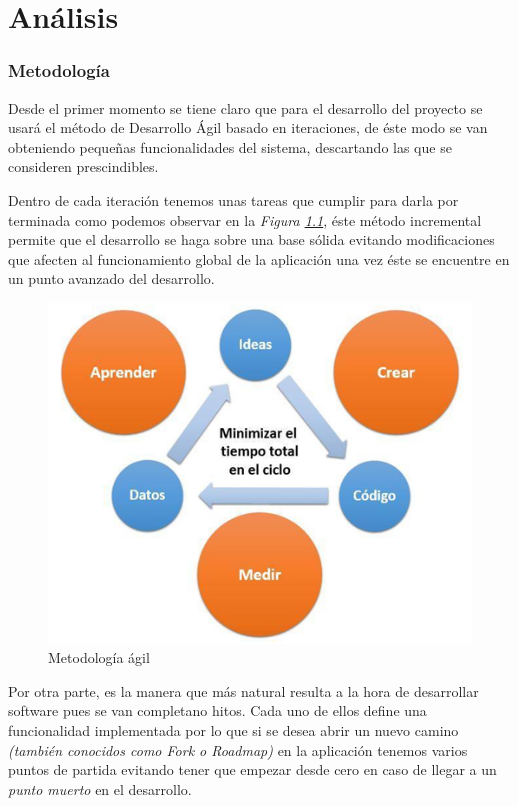 \chapter{Análisis}
\label{chap4}


\subsection{Metodología}

Desde el primer momento se tiene claro que para el desarrollo del proyecto se usará el método de Desarrollo Ágil basado en iteraciones, de éste modo se van obteniendo pequeñas funcionalidades del sistema, descartando las que se consideren prescindibles.

Dentro de cada iteración tenemos unas tareas que cumplir para darla por terminada como podemos observar en la \textit{Figura \ref{fig:met_agil}}, éste método incremental permite que el desarrollo se haga sobre una base sólida evitando modificaciones que afecten al funcionamiento global de la aplicación una vez éste se encuentre en un punto avanzado del desarrollo.


\begin{figure}[!ht]
  \begin{center}
    \includegraphics[scale=0.70]{../images/metodologia/agil.png}
    \caption{Metodología ágil}
    \label{fig:met_agil}
  \end{center}
\end{figure}


Por otra parte, es la manera que más natural resulta a la hora de desarrollar software pues se van completano hitos. Cada uno de ellos define una funcionalidad implementada por lo que si se desea abrir un nuevo camino \textit{(también conocidos como Fork o Roadmap)} en la aplicación tenemos varios puntos de partida evitando tener que empezar desde cero en caso de llegar a un \textit{punto muerto} en el desarrollo.

